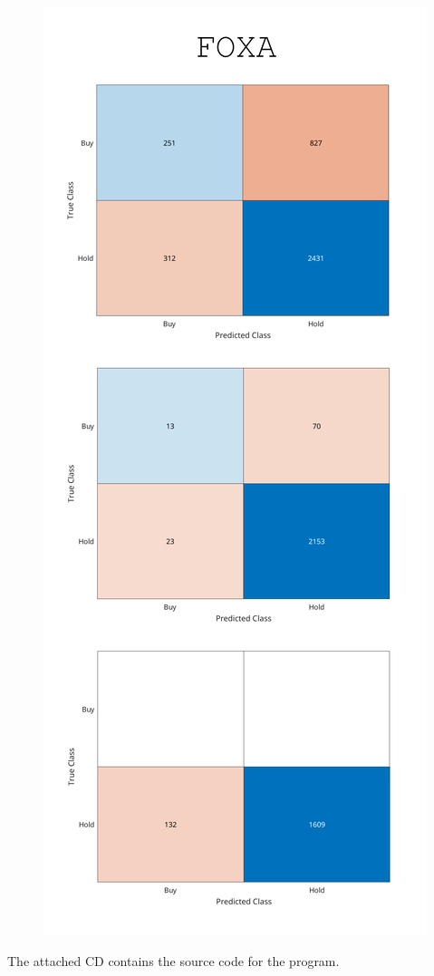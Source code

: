 \documentclass[a4paper,oneside,onecolumn,12pt]{book}
\begin{document}
\begin{figure}[H]
\begin{center}
	\includegraphics[height=0.8\textheight, keepaspectratio]{kep/FOXA2.png}
\end{center}
\end{figure}
\endgroup

The attached CD contains the source code for the program.
\end{document}

